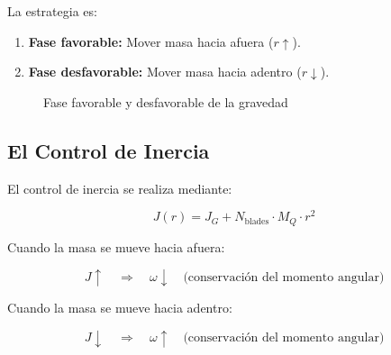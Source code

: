 \documentclass[12pt,a4paper]{article}
\begin{document}
La estrategia es:

\begin{enumerate}
    \item \textbf{Fase favorable:} Mover masa hacia afuera ($r \uparrow$).
    \item \textbf{Fase desfavorable:} Mover masa hacia adentro ($r \downarrow$).
\end{enumerate}

\begin{figure}[H]
\centering
{}
\caption{Fase favorable y desfavorable de la gravedad}
\label{fig:fase}
\end{figure}

\subsection{El Control de Inercia}

El control de inercia se realiza mediante:

\begin{equation}
J(r) = J_G + N_{\text{blades}} \cdot M_Q \cdot r^2
\end{equation}

Cuando la masa se mueve hacia afuera:

\begin{equation}
J \uparrow \quad \Rightarrow \quad \omega \downarrow \quad \text{(conservación del momento angular)}
\end{equation}

Cuando la masa se mueve hacia adentro:

\begin{equation}
J \downarrow \quad \Rightarrow \quad \omega \uparrow \quad \text{(conservación del momento angular)}
\end{equation}
\end{document}
